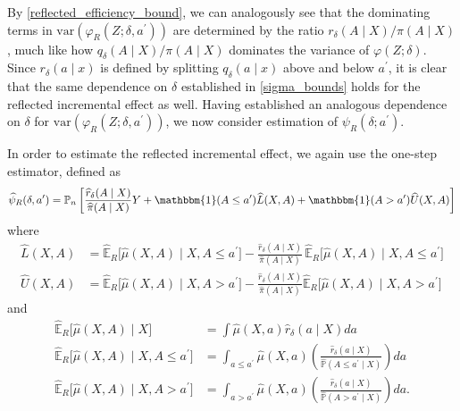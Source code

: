 \documentclass[11pt,twoside]{article}
\newcommand{\var}{\text{var}}
\theoremstyle{definition}
\theoremstyle{remark}
\begin{document}
By \cref{reflected_efficiency_bound}, we can analogously see that the dominating terms in $\var(\varphi_R(Z;\delta, a^\prime))$ are determined by the ratio $r_\delta(A \mid X) / \pi(A \mid X)$, much like how $q_\delta(A \mid X) / \pi(A \mid X)$ dominates the variance of $\varphi(Z;\delta)$. Since $r_\delta(a \mid x)$ is defined by splitting $q_\delta(a \mid x)$ above and below $a^{\prime}$, it is clear that the same dependence on $\delta$ established in \cref{sigma_bounds} holds for the reflected incremental effect as well. Having established an analogous dependence on $\delta$ for $\var(\varphi_R(Z;\delta, a^\prime))$, we now consider estimation of $\psi_R(\delta; a^\prime)$.

In order to estimate the reflected incremental effect, we again use the one-step estimator, defined as
\begin{align*}
  \widehat\psi_R(\delta, a^{\prime}) = 
  \mathbb{P}_n \left[
      \frac{\widehat r_\delta(A \mid X)}{\widehat\pi(A \mid X)}
       Y +
        \mathbbm{1}(A \leq a^{\prime})\widehat L(X, A) + 
        \mathbbm{1}(A > a^{\prime})\widehat U(X, A)
    \right]
\end{align*}
where
\begin{align*}
  \widehat L(X, A)
  &= \widehat{\mathbb{E}}_R\big[\widehat\mu(X, A) \mid X, A \leq a^{\prime}\big] -
     \frac{\widehat r_\delta(A \mid X)}{\widehat\pi(A \mid X)}\,
     \widehat{\mathbb{E}}_R\big[\widehat\mu(X, A) \mid X, A \le a^{\prime} \big] \\
  \widehat U(X, A)
  &= \widehat{\mathbb{E}}_R\big[\widehat\mu(X, A) \mid X, A > a^{\prime}\big]  - \frac{\widehat r_\delta(A \mid X)}{\widehat\pi(A \mid X)}
     \widehat{\mathbb{E}}_R\big[\widehat\mu(X, A) \mid X, A > a^{\prime}\big]
\end{align*}
and
\begin{align*}
  \widehat{\mathbb{E}}_R\big[\widehat\mu(X, A) \mid X\big]
  &= \int \widehat\mu(X, a)\widehat r_\delta(a \mid X) da \\[0.4em]
  \widehat{\mathbb{E}}_R\big[\widehat\mu(X, A) \mid X, A \le a^{\prime}\big]
  &= \int_{a \le a^{\prime}} \widehat\mu(X, a) \left(
      \frac{\widehat r_\delta(a \mid X)}
           {\widehat{\mathbb{P}}(A \le a^{\prime} \mid X)} \right) da \\
  \widehat{\mathbb{E}}_R\big[\widehat\mu(X, A) \mid X, A > a^{\prime}\big]
  &= \int_{a > a^{\prime}} \widehat\mu(X, a) \left(
      \frac{\widehat r_\delta(a \mid X)}
           {\widehat{\mathbb{P}}(A > a^{\prime} \mid X)} \right) da.
\end{align*}
\end{document}
